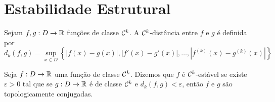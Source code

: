 \section{Estabilidade Estrutural}

\begin{definition}
Sejam $f, g: D \to \mathbb{R}$ funções de classe $\mathcal{C}^k$. A $\mathcal{C}^k$-distância entre $f$ e $g$ é definida por
$$d_k(f, g) = \sup_{x \in D} \left \{ |f(x) - g(x)|, |f'(x) - g'(x)|, \dots, |f^{(k)}(x) - g^{(k)}(x)| \right \}$$
\end{definition}

\begin{definition}
Seja $f: D \to \mathbb{R}$ uma função de classe $\mathcal{C}^k$. Dizemos que $f$ é $\mathcal{C}^k$-estável se existe $\varepsilon > 0$ tal que se $g: D \to \mathbb{R}$ é de classe $\mathcal{C}^k$ e $d_k(f, g) < \varepsilon$, então $f$ e $g$ são topologicamente conjugadas.
\end{definition}

